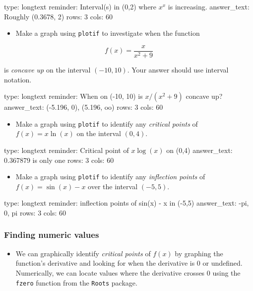 \documentclass[12pt]{article}
\begin{document}
\begin{answer}
type: longtext
reminder: Interval(s) in (0,2) where \( x^x \) is increasing.
answer_text: Roughly (0.3678, 2) 
rows: 3
cols: 60
\end{answer}

\begin{itemize}
\itemsep1pt\parskip0pt
\item
  Make a graph using \texttt{plotif} to investigate when the function
\end{itemize}

\[
f(x) = \frac{x}{x^2+9}
\]

is \emph{concave up} on the interval $(-10,10)$. Your answer should use
interval notation.

\begin{answer}
type: longtext
reminder: When on (-10, 10) is \( x/(x^2 + 9) \) concave up?
answer_text: (-5.196, 0), (5.196, oo) 
rows: 3
cols: 60
\end{answer}

\begin{itemize}
\itemsep1pt\parskip0pt
\item
  Make a graph using \texttt{plotif} to identify any \emph{critical
  points} of $f(x) = x \ln(x)$ on the interval $(0,4)$.
\end{itemize}

\begin{answer}
type: longtext
reminder: Critical point of \( x \log(x) \) on (0,4)
answer_text: 0.367879 is only one 
rows: 3
cols: 60
\end{answer}

\begin{itemize}
\itemsep1pt\parskip0pt
\item
  Make a graph using \texttt{plotif} to identify any \emph{inflection
  points} of $f(x) = \sin(x) - x$ over the interval $(-5,5)$.
\end{itemize}

\begin{answer}
type: longtext
reminder: inflection points of sin(x) - x in (-5,5)
answer_text: -pi, 0, pi 
rows: 3
cols: 60
\end{answer}

\subsubsection{Finding numeric values}

\begin{itemize}
\itemsep1pt\parskip0pt
\item
  We can graphically identify \emph{critical points} of $f(x)$ by
  graphing the function's derivative and looking for when the derivative
  is 0 or undefined. Numerically, we can locate values where the
  derivative crosses $0$ using the \texttt{fzero} function from the
  \texttt{Roots} package.
\end{itemize}
\end{document}
